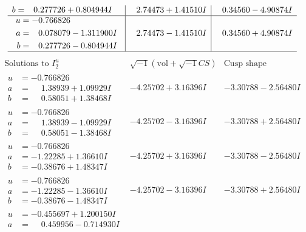 \documentclass[1p]{elsarticle_modified}
\theoremstyle{definition}
\newcommand{\I}{\sqrt{-1}}
\begin{document}
$$\begin{array}{c|c|c}
\begin{aligned}
b &= \phantom{-}0.277726 + 0.804944 I\end{aligned}
 & \phantom{-}2.74473 + 1.41510 I & \phantom{-}0.34560 - 4.90874 I \\ \hline\begin{aligned}
u &= -0.766826\phantom{ +0.000000I} \\
a &= \phantom{-}0.078079 - 1.311900 I \\
b &= \phantom{-}0.277726 - 0.804944 I\end{aligned}
 & \phantom{-}2.74473 - 1.41510 I & \phantom{-}0.34560 + 4.90874 I\\
 \hline 
 \end{array}$$\newpage$$\begin{array}{c|c|c}  
\text{Solutions to }I^u_{2}& \I (\text{vol} + \sqrt{-1}CS) & \text{Cusp shape}\\
 \hline 
\begin{aligned}
u &= -0.766826\phantom{ +0.000000I} \\
a &= \phantom{-}1.38939 + 1.09929 I \\
b &= \phantom{-}0.58051 + 1.38468 I\end{aligned}
 & -4.25702 + 3.16396 I & -3.30788 - 2.56480 I \\ \hline\begin{aligned}
u &= -0.766826\phantom{ +0.000000I} \\
a &= \phantom{-}1.38939 - 1.09929 I \\
b &= \phantom{-}0.58051 - 1.38468 I\end{aligned}
 & -4.25702 - 3.16396 I & -3.30788 + 2.56480 I \\ \hline\begin{aligned}
u &= -0.766826\phantom{ +0.000000I} \\
a &= -1.22285 + 1.36610 I \\
b &= -0.38676 + 1.48347 I\end{aligned}
 & -4.25702 + 3.16396 I & -3.30788 - 2.56480 I \\ \hline\begin{aligned}
u &= -0.766826\phantom{ +0.000000I} \\
a &= -1.22285 - 1.36610 I \\
b &= -0.38676 - 1.48347 I\end{aligned}
 & -4.25702 - 3.16396 I & -3.30788 + 2.56480 I \\ \hline\begin{aligned}
u &= -0.455697 + 1.200150 I \\
a &= \phantom{-}0.459956 - 0.714930 I \\

\end{aligned}
\end{array}$$
\end{document}
